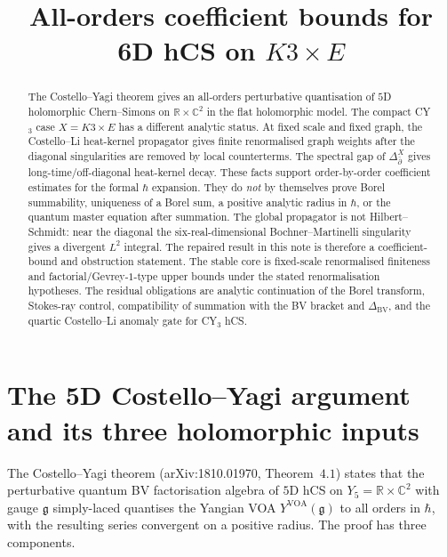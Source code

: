 \documentclass[11pt]{article}
\title{All-orders coefficient bounds for 6D hCS on $K3\times E$}
\author{}\date{}
\providecommand{\frakg}{\mathfrak{g}}
\providecommand{\dbar}{\bar{\partial}}
\providecommand{\BV}{\mathrm{BV}}
\providecommand{\C}{\mathbb{C}}
\providecommand{\R}{\mathbb{R}}
\theoremstyle{definition}\newtheorem{definition}[theorem]{Definition}
\theoremstyle{remark}\newtheorem{remark}[theorem]{Remark}\newtheorem{example}[theorem]{Example}
\begin{document}
\maketitle

\begin{abstract}
The Costello--Yagi theorem gives an all-orders perturbative
quantisation of $5$D holomorphic Chern--Simons on $\R\times\C^2$ in
the flat holomorphic model. The compact CY$_3$ case
$X = K3\times E$ has a different analytic status. At fixed scale and
fixed graph, the Costello--Li heat-kernel propagator gives finite
renormalised graph weights after the diagonal singularities are removed
by local counterterms. The spectral gap of $\Delta_{\dbar}^X$ gives
long-time/off-diagonal heat-kernel decay. These facts support
order-by-order coefficient estimates for the formal $\hbar$ expansion.
They do \emph{not} by themselves prove Borel summability, uniqueness of
a Borel sum, a positive analytic radius in $\hbar$, or the quantum
master equation after summation. The global propagator is not
Hilbert--Schmidt: near the diagonal the six-real-dimensional
Bochner--Martinelli singularity gives a divergent $L^2$ integral.
The repaired result in this note is therefore a coefficient-bound and
obstruction statement. The stable core is fixed-scale renormalised
finiteness and factorial/Gevrey-$1$-type upper bounds under the stated
renormalisation hypotheses. The residual obligations are analytic
continuation of the Borel transform, Stokes-ray control, compatibility
of summation with the BV bracket and $\Delta_{\BV}$, and the quartic
Costello--Li anomaly gate for CY$_3$ hCS.
\end{abstract}

\section{The 5D Costello--Yagi argument and its three holomorphic inputs}

The Costello--Yagi theorem (arXiv:1810.01970, Theorem~$4.1$) states that
the perturbative quantum BV factorisation algebra of $5$D hCS on
$Y_5 = \R\times \C^2$ with gauge $\frakg$ simply-laced quantises the
Yangian VOA $Y^{\mathrm{VOA}}(\frakg)$ to all orders in $\hbar$, with
the resulting series convergent on a positive radius. The proof has
three components.
\end{document}
